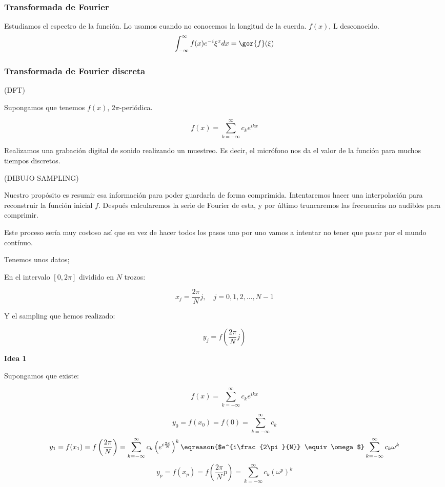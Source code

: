 		\subsubsection{Transformada de Fourier}
			Estudiamos el espectro de la función. Lo usamos cuando no conocemos la longitud de la cuerda.
					$f(x)$, L desconocido.
					\[\int_{-\infty}^\infty f(x) e^{-i} \xi^x dx = \gor{f} (\xi) \]

		\subsubsection{Transformada de Fourier discreta} (DFT)

			Supongamos que tenemos $f(x)$, $2\pi$-periódica.

			\[ f(x) = \sum_{k=-\infty}^\infty c_k e^{ikx}\]

			Realizamos una grabación digital de sonido realizando un muestreo. Es decir, el micrófono nos da el valor de la función para muchos tiempos discretos.

			(DIBUJO SAMPLING)

			Nuestro propósito es resumir esa información para poder guardarla de forma comprimida. Intentaremos hacer una interpolación para reconstruir la función inicial $f$. Después calcularemos la serie de Fourier de esta, y por último truncaremos las frecuencias no audibles para comprimir.

			Este proceso sería muy costoso así que en vez de hacer todos los pasos uno por uno vamos a intentar no tener que pasar por el mundo contínuo.

			Tenemos unos datos;

			En el intervalo $[0,2\pi]$ dividido en $N$ trozos:

			\[x_j = \frac{2\pi}{N}j, \quad j=0,1,2,…,N-1\]

			Y el sampling que hemos realizado:

			\[ y_j = f(\frac{2\pi}{N}j)\]


			\textbf{Idea 1}

			Supongamos que existe:

			\[f(x) = \sum_{k=-\infty}^\infty c_k e^{ikx} \]

			\[ y_0 = f(x_0) = f(0) = \sum_{k=-\infty}^\infty c_k \]
			\[ y_1 = f(x_1) = f\left(\frac{2\pi}{N}\right) = \sum_{k=-\infty}^\infty c_k \left( e^{i\frac{2\pi}{N}} \right)^k \eqreason{$e^{i\frac{2\pi}{N}} \equiv \omega $} \sum_{k=-\infty}^\infty c_k \omega^k \]
			\[ y_p = f(x_p) = f\left(\frac{2\pi}{N}p\right) = \sum_{k=-\infty}^\infty c_k \left(\omega^p\right)^k \]



